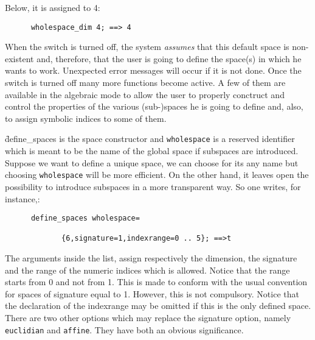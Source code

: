 \hypertarget{operator:WHOLESPACE_DIM}{}
Below, it is assigned to 4:
\begin{verbatim}
      wholespace_dim 4; ==> 4
\end{verbatim}
When the switch  is turned off, the system \emph{assumes} that this default
space is non-existent and, therefore, that the user is going to define the
space(s) in which he wants to work.
Unexpected error messages will occur if it is not done.
Once the switch is turned off many more functions become active. A few of them are
available in the algebraic mode to allow the user to properly conctruct
and control the properties of the various (sub-)spaces he is going to define
and, also, to assign symbolic indices to some of them.

\hypertarget{command:DEFINE_SPACES}{}
\hypertarget{reserved:WHOLESPACE}{}
\hypertarget{reserved:SIGNATURE}{}
\hypertarget{reserved:INDEXRANGE}{}
\f{define\_spaces} is the space constructor and
\texttt{wholespace}
is a reserved identifier which is meant to be the name of the global space
if subspaces are introduced.
Suppose we want to define a unique space, we can choose for its any name but
choosing \texttt{wholespace} will be more efficient. On the other hand, it leaves
open the possibility to introduce subspaces in a more transparent way.
So one writes, for instance,:
\begin{verbatim}
      define_spaces wholespace=

             {6,signature=1,indexrange=0 .. 5}; ==>t
\end{verbatim} 
The arguments inside the list, assign respectively the dimension, the signature
and the range of the numeric indices which is allowed.
Notice that the range starts from 0 and not from 1. This is made to conform with
the usual convention for spaces of signature equal to 1. However, this is not
compulsory.
Notice that the declaration of the indexrange may be omitted if this is the
only  defined space.
\hypertarget{reserved:EUCLIDIAN}{}
\hypertarget{reserved:AFFINE}{}
There are two other options which may replace the signature option, namely
\texttt{euclidian} and \texttt{affine}. They
have both an obvious significance.

